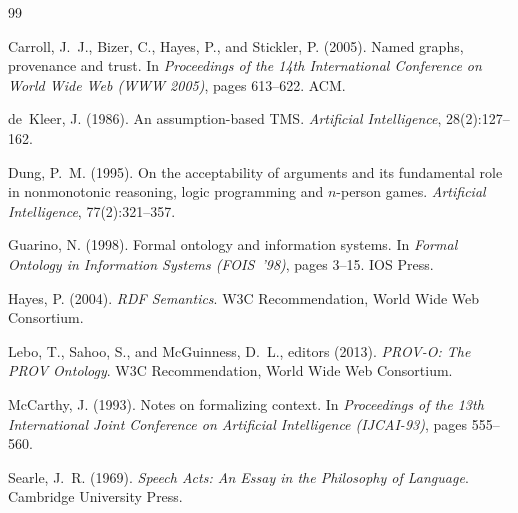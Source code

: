 \documentclass[11pt]{article}
\theoremstyle{plain}
\theoremstyle{definition}
\theoremstyle{remark}
\begin{document}
\begin{thebibliography}{99}

  Carroll, J.~J., Bizer, C., Hayes, P., and Stickler, P. (2005).
  Named graphs, provenance and trust.
  In \emph{Proceedings of the 14th International Conference on World Wide Web
    (WWW 2005)}, pages 613--622. ACM.

  de~Kleer, J. (1986).
  An assumption-based TMS.
  \emph{Artificial Intelligence}, 28(2):127--162.

  Dung, P.~M. (1995).
  On the acceptability of arguments and its fundamental role in nonmonotonic
  reasoning, logic programming and $n$-person games.
  \emph{Artificial Intelligence}, 77(2):321--357.

  Guarino, N. (1998).
  Formal ontology and information systems.
  In \emph{Formal Ontology in Information Systems (FOIS~'98)}, pages 3--15.
  IOS Press.

  Hayes, P. (2004).
  \emph{RDF Semantics}.
  W3C Recommendation, World Wide Web Consortium.

  Lebo, T., Sahoo, S., and McGuinness, D.~L., editors (2013).
  \emph{PROV-O: The PROV Ontology}.
  W3C Recommendation, World Wide Web Consortium.

  McCarthy, J. (1993).
  Notes on formalizing context.
  In \emph{Proceedings of the 13th International Joint Conference on Artificial
    Intelligence (IJCAI-93)}, pages 555--560.

  Searle, J.~R. (1969).
  \emph{Speech Acts: An Essay in the Philosophy of Language}.
  Cambridge University Press.

\end{thebibliography}
\end{document}
